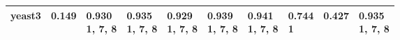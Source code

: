 \begin{tabular}{llllllllll}
yeast3                 &                        \makecell{0.149 \\ \scriptsize{}} &  \makecell{0.930 \\ \scriptsize{1, 7, 8}} &           \makecell{0.935 \\ \scriptsize{1, 7, 8}} &           \makecell{0.929 \\ \scriptsize{1, 7, 8}} &        \makecell{0.939 \\ \scriptsize{1, 7, 8}} &              \makecell{0.941 \\ \scriptsize{1, 7, 8}} &                       \makecell{0.744 \\ \scriptsize{1}} &      \makecell{0.427 \\ \scriptsize{}} &  \makecell{0.935 \\ \scriptsize{1, 7, 8}} \\
\bottomrule
\end{tabular}
